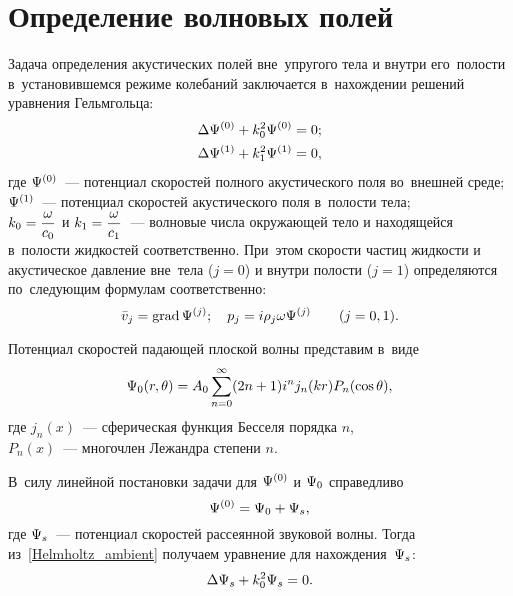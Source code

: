 \section{Определение волновых полей}
Задача определения акустических полей вне~упругого тела и внутри его~полости в~установившемся режиме колебаний заключается в~нахождении решений уравнения Гельмгольца:
\begin{align}
\Lap\P^{(0)} &+ k_0^2\P^{(0)} = 0;\label{Helmholtz_ambient}\\
\Lap\P^{(1)} &+ k_1^2\P^{(1)} = 0,\label{Helmholtz_hollow}
\end{align}
где $\P^{(0)}$~--- потенциал скоростей полного акустического поля во~внешней среде;\\
$\P^{(1)}$~--- потенциал скоростей акустического поля в~полости тела;\\
$k_0 = \df{\om}{c_0}$ и $k_1 = \df{\om}{c_1}$~--- волновые числа окружающей тело и находящейся в~полости жидкостей соответственно. При~этом скорости частиц жидкости и акустическое давление вне~тела ($j = 0$) и внутри полости ($j = 1$) определяются по~следующим формулам соответственно:
\begin{equation}
\bar{v}_j = \grad\P^{(j)}; \q p_j = i\r_j\om\P^{(j)} \qq (j = 0, 1).
\end{equation}

Потенциал скоростей падающей плоской волны представим в~виде
\begin{equation}
\P_0(r, \Q) = A_0 \sum\limits_{n = 0}^{\infty} (2n + 1) i^n j_n(kr) P_n(\cos\Q),
\end{equation}
где $j_n(x)$~--- сферическая функция Бесселя порядка $n$, \\
$P_n(x)$~--- многочлен Лежандра степени $n$.


В~силу линейной постановки задачи для $\P^{(0)}$ и $\P_0$ справедливо
\begin{equation} \label{potention_speed_ambient}
\P^{(0)} = \P_0 + \P_s,
\end{equation}
где $\P_s$~--- потенциал скоростей рассеянной звуковой волны. Тогда из~\eqref{Helmholtz_ambient} получаем уравнение для нахождения~$\P_s$:
\begin{equation} \label{Helmholtz_ambient_diffraction}
\Lap\P_s + k_0^2\P_s = 0.
\end{equation}

